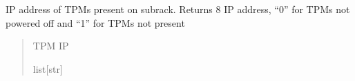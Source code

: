 \documentclass[letterpaper,10pt,english]{sphinxmanual}
\begin{document}
\begin{fulllineitems}
\label{\detokenize{webserverdocs:subrack_hardware.TpmIPs}}
\pysigstartsignatures
{}
\pysigstopsignatures
\sphinxAtStartPar
IP address of TPMs present on subrack.
Returns 8 IP address, “0” for TPMs not powered off and “\sphinxhyphen{}1” for TPMs not present

\begin{fulllineitems}
\label{\detokenize{webserverdocs:subrack_hardware.TpmIPs.read_value}}
\pysigstartsignatures
{}
\pysigstopsignatures\begin{quote}\begin{description}
\sphinxAtStartPar
TPM IP

\sphinxAtStartPar
list{[}str{]}

\end{description}\end{quote}

\end{fulllineitems}


\end{fulllineitems}

\end{document}
